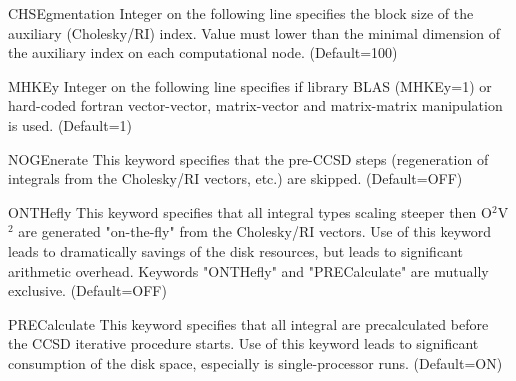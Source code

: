 \begin{keywordlist}
\item[CHSEgmentation]
Integer on the following line specifies the block size of the auxiliary (Cholesky/RI)
index. Value must lower than the minimal dimension of the auxiliary index on each
computational node. (Default=100)
\item[MHKEy]
Integer on the following line specifies if library BLAS (MHKEy=1) or hard-coded
fortran vector-vector, matrix-vector and matrix-matrix manipulation is used.
(Default=1)
\item[NOGEnerate]
This keyword specifies that the pre-CCSD steps (regeneration of integrals from
the Cholesky/RI vectors, etc.) are skipped.
(Default=OFF)
\item[ONTHefly]
This keyword specifies that all integral types scaling steeper then O$^{2}$V$^{2}$
are generated "on-the-fly" from the Cholesky/RI vectors. Use of this keyword leads
to dramatically savings of the disk resources, but leads to significant arithmetic
overhead. Keywords "ONTHefly"
and "PRECalculate" are mutually exclusive.
(Default=OFF)
\item[PRECalculate]
This keyword specifies that all integral are precalculated before the
CCSD iterative procedure starts. Use of this keyword leads to significant
consumption of the disk space, especially is single-processor runs.
(Default=ON)

\end{keywordlist}
